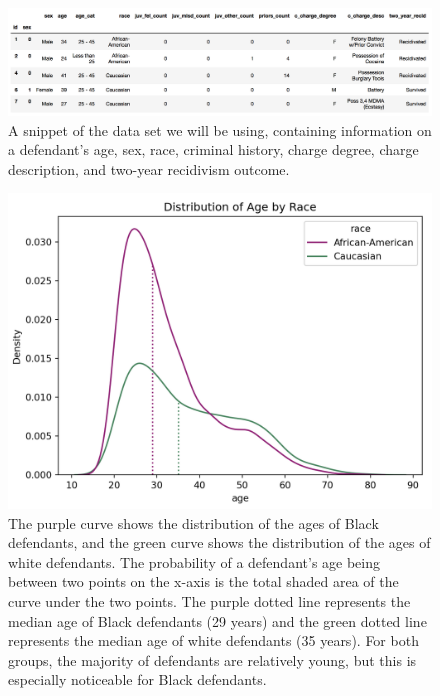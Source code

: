 \documentclass[water,article,submit,moreauthors,pdftex]{mdpi}
\begin{document}
\begin{figure}

{\centering \includegraphics[width=1\linewidth]{../images/table_snippet} 

}

\caption{A snippet of the data set we will be using, containing information on a defendant's age, sex, race, criminal history, charge degree, charge description, and two-year recidivism outcome.}\label{fig:table snip}
\end{figure}

\begin{figure}

{\centering \includegraphics[width=1\linewidth]{../images/age_race_plot_new} 

}

\caption{The purple curve shows the distribution of the ages of Black defendants, and the green curve shows the distribution of the ages of white defendants. The probability of a defendant's age being between two points on the x-axis is the total shaded area of the curve under the two points. The purple dotted line represents the median age of Black defendants (29 years) and the green dotted line represents the median age of white defendants (35 years). For both groups, the majority of defendants are relatively young, but this is especially noticeable for Black defendants.}\label{fig:age plot}
\end{figure}
\end{document}
